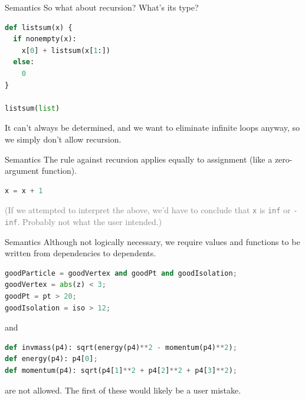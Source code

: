\documentclass{beamer}
\begin{document}
\begin{frame}[fragile]{Semantics}
So what about recursion? What's its type?

\begin{center}
\begin{minipage}{0.9\linewidth}
\small
\begin{lstlisting}[language=python]
def listsum(x) {
  if nonempty(x):
    x[0] + listsum(x[1:])
  else:
    0
}

listsum(list)
\end{lstlisting}
\end{minipage}
\end{center}

It can't always be determined, and we want to eliminate infinite loops anyway, so we simply don't allow recursion.
\end{frame}

\begin{frame}[fragile]{Semantics}
The rule against recursion applies equally to assignment (like a zero-argument function).

\begin{center}
\begin{minipage}{0.9\linewidth}
\small
\begin{lstlisting}[language=python]
x = x + 1
\end{lstlisting}
\end{minipage}
\end{center}

\textcolor{gray}{(If we attempted to interpret the above, we'd have to conclude that {\tt x} is {\tt inf} or {\tt -inf}. Probably not what the user intended.)}
\end{frame}

\begin{frame}[fragile]{Semantics}
\vspace{0.5 cm}
Although not logically necessary, we require values and functions to be written from dependencies to dependents.

\begin{center}
\begin{minipage}{0.9\linewidth}
\small
\begin{lstlisting}[language=python]
goodParticle = goodVertex and goodPt and goodIsolation;
goodVertex = abs(z) < 3;
goodPt = pt > 20;
goodIsolation = iso > 12;
\end{lstlisting}
\hspace{-0.6 cm} and
\begin{lstlisting}[language=python]
def invmass(p4): sqrt(energy(p4)**2 - momentum(p4)**2);
def energy(p4): p4[0];
def momentum(p4): sqrt(p4[1]**2 + p4[2]**2 + p4[3]**2);
\end{lstlisting}
\end{minipage}
\end{center}

are not allowed. The first of these would likely be a user mistake.
\end{frame}

\begin{frame}{}

\end{frame}
\end{document}
